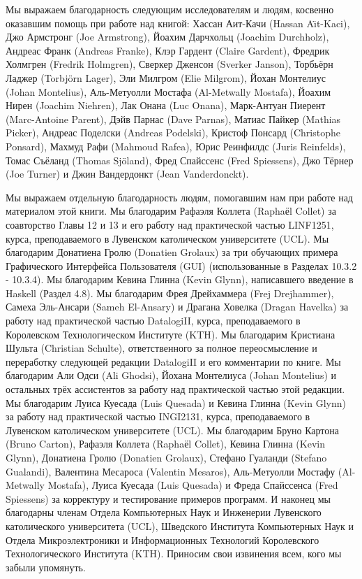 Мы выражаем благодарность следующим исследователям и людям, косвенно оказавшим помощь при работе над книгой: Хассан Аит-Качи (Hassan A{\"\i}t-Kaci), Джо Армстронг (Joe Armstrong), Йоахим Дарчхольц (Joachim Durchholz), Андреас Франк (Andreas Franke), Клэр Гардент (Claire Gardent), Фредрик Холмгрен (Fredrik Holmgren), Сверкер Дженсон (Sverker Janson), Торбьёрн Ладжер (Torbj{\"o}rn Lager), Эли Милгром (Elie Milgrom), Йохан Монтелиус (Johan Montelius), Аль-Метуолли Мостафа (Al-Metwally Mostafa), Йоахим Нирен (Joachim Niehren), Лак Онана (Luc Onana), Марк-Антуан Пиерент (Marc-Antoine Parent), Дэйв Парнас (Dave Parnas), Матиас Пайкер (Mathias Picker), Андреас Поделски (Andreas Podelski), Кристоф Понсард (Christophe Ponsard), Махмуд Рафи (Mahmoud Rafea), Юрис Реинфилдс (Juris Reinfelds), Томас Съёланд (Thomas Sj{\"o}land), Фред Спайссенс (Fred Spiessens), Джо Тёрнер (Joe Turner) и Джин Вандердонкт (Jean Vanderdonckt).

Мы выражаем отдельную благодарность людям, помогавшим нам при работе над материалом этой книги. Мы благодарим Рафаэля Коллета (Raphaёl Collet) за соавторство Главы 12 и 13 и его работу над практической частью LINF1251, курса, преподаваемого в Лувенском католическом университете (UCL). Мы благодарим Донатиена Гролю (Donatien Grolaux) за три обучающих примера Графического Интерфейса Пользователя (GUI) (использованные в Разделах 10.3.2 - 10.3.4). Мы благодарим Кевина Глинна (Kevin Glynn), написавшего введение в Haskell (Раздел 4.8). Мы благодарим Фрея Дрейхаммера (Frej Drejhammer), Самеха Эль-Ансари (Sameh El-Ansary) и Драгана Ховелка (Dragan Havelka) за работу над практической частью DatalogiII, курса, преподаваемого в Королевском Технологическом Институте (KTH). Мы благодарим Кристиана Шульта (Christian Schulte), ответственного за полное переосмысление и переработку следующей редакции DatalogiII и его комментарии по книге. Мы благодарим Али Одси (Ali Ghodsi), Йохана Монтелиуса (Johan Montelius) и остальных трёх ассистентов за работу над практической частью этой редакции. Мы благодарим Луиса Куесада (Luis Quesada) и Кевина Глинна (Kevin Glynn) за работу над практической частью INGI2131, курса, преподаваемого в Лувенском католическом университете (UCL). Мы благодарим Бруно Картона (Bruno Carton), Рафаэля Коллета (Raphaёl Collet), Кевина Глинна (Kevin Glynn), Донатиена Гролю (Donatien Grolaux), Стефано Гуаланди (Stefano Gualandi), Валентина Месароса (Valentin Mesaros), Аль-Метуолли Мостафу (Al-Metwally Mostafa), Луиса Куесада (Luis Quesada) и Фреда Спайссенса (Fred Spiessens) за корректуру и тестирование примеров программ. И наконец мы благодарны членам Отдела Компьютерных Наук и Инженерии Лувенского католического университета (UCL), Шведского Института Компьютерных Наук и Отдела Микроэлектроники и Информационных Технологий Королевского Технологического Института (KTH). Приносим свои извинения всем, кого мы забыли упомянуть.

